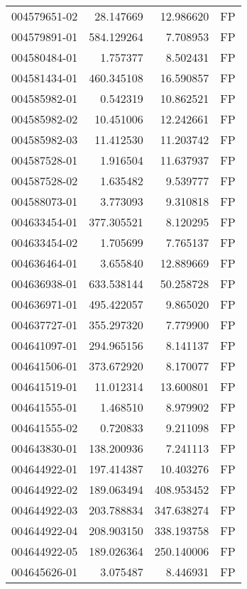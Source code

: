 \begin{tabular}{lrrl}
004579651-02 &   28.147669 &      12.986620 &   FP \\
004579891-01 &  584.129264 &       7.708953 &   FP \\
004580484-01 &    1.757377 &       8.502431 &   FP \\
004581434-01 &  460.345108 &      16.590857 &   FP \\
004585982-01 &    0.542319 &      10.862521 &   FP \\
004585982-02 &   10.451006 &      12.242661 &   FP \\
004585982-03 &   11.412530 &      11.203742 &   FP \\
004587528-01 &    1.916504 &      11.637937 &   FP \\
004587528-02 &    1.635482 &       9.539777 &   FP \\
004588073-01 &    3.773093 &       9.310818 &   FP \\
004633454-01 &  377.305521 &       8.120295 &   FP \\
004633454-02 &    1.705699 &       7.765137 &   FP \\
004636464-01 &    3.655840 &      12.889669 &   FP \\
004636938-01 &  633.538144 &      50.258728 &   FP \\
004636971-01 &  495.422057 &       9.865020 &   FP \\
004637727-01 &  355.297320 &       7.779900 &   FP \\
004641097-01 &  294.965156 &       8.141137 &   FP \\
004641506-01 &  373.672920 &       8.170077 &   FP \\
004641519-01 &   11.012314 &      13.600801 &   FP \\
004641555-01 &    1.468510 &       8.979902 &   FP \\
004641555-02 &    0.720833 &       9.211098 &   FP \\
004643830-01 &  138.200936 &       7.241113 &   FP \\
004644922-01 &  197.414387 &      10.403276 &   FP \\
004644922-02 &  189.063494 &     408.953452 &   FP \\
004644922-03 &  203.788834 &     347.638274 &   FP \\
004644922-04 &  208.903150 &     338.193758 &   FP \\
004644922-05 &  189.026364 &     250.140006 &   FP \\
004645626-01 &    3.075487 &       8.446931 &   FP \\

\end{tabular}
